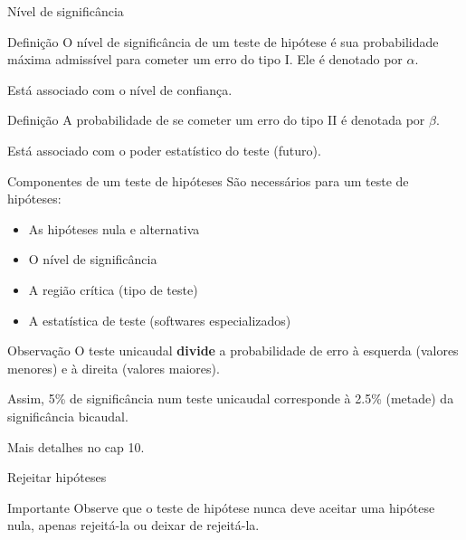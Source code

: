 \documentclass{beamer}
\begin{document}
\begin{frame}{Nível de significância}
  \begin{block}{Definição}
    O \alert{nível de significância} de um teste de hipótese é sua
    probabilidade máxima admissível para cometer um erro do tipo
    I. Ele é denotado por $\alpha$.

    \bigskip
    Está associado com o nível de confiança.
  \end{block}
  \begin{block}{Definição}
    A probabilidade de se cometer um erro do tipo II é denotada por
    $\beta$.

    \bigskip Está associado com o poder estatístico do teste (futuro).
  \end{block}
\end{frame}

\begin{frame}{Componentes de um teste de hipóteses}
  São necessários para um teste de hipóteses:
  \begin{itemize}
  \item As hipóteses nula e alternativa
  \item O nível de significância
  \item A região crítica (tipo de teste)
  \item A estatística de teste (softwares especializados)
  \end{itemize}
  \begin{block}{Observação}
    O teste unicaudal {\bf divide} a probabilidade de erro à esquerda (valores menores) e à direita (valores maiores).

    \bigskip
    Assim, 5\% de significância num teste unicaudal corresponde à 2.5\% (metade) da significância bicaudal.

    \bigskip
    Mais detalhes no cap 10.
  \end{block}
\end{frame}

\begin{frame}{Rejeitar hipóteses}
  \begin{block}{Importante}
    Observe que o teste de hipótese nunca deve \alert{aceitar} uma
    hipótese nula, apenas rejeitá-la ou deixar de rejeitá-la.
  \end{block}
\end{frame}
\end{document}
